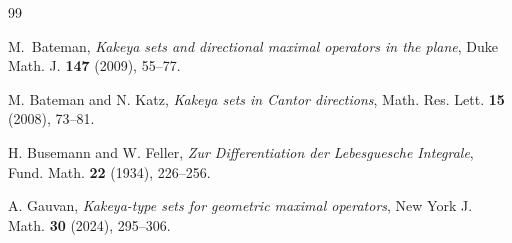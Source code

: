 \documentclass[12pt]{amsart}
\numberwithin{equation}{section}
\theoremstyle{definition}
\theoremstyle{remark}
\begin{document}
\begin{thebibliography}{99}




 M.~Bateman, \emph{
 Kakeya sets and directional maximal operators in the plane},
 Duke Math. J. {\bf{147}} (2009), 55--77.


 M. Bateman and N. Katz, \emph{Kakeya sets in Cantor
directions}, Math. Res. Lett. {\bf{15}} (2008), 73--81.


 H. Busemann and W. Feller, \emph{Zur Differentiation der Lebesguesche Integrale}, Fund. Math. {\bf{22}} (1934), 226--256.




A. Gauvan, \emph{Kakeya-type sets for geometric maximal operators}, New York J. Math. {\bf{30}} (2024), 295--306.














\end{thebibliography}
\end{document}
